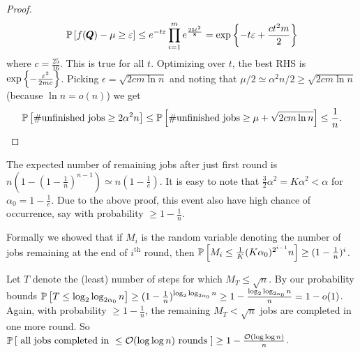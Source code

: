 \begin{proof}
\begin{align*}
\P{f(\pmb Q)-\mu\ge \epsilon} \le e^{-t\epsilon}\prod_{i=1}^{m} e^{\frac{25t^{2}}{8}} = \exp\set{-t\epsilon + \frac{ct^{2}m}{2}}
\end{align*}
where $c=\frac{25}{16}$. This is true for all $t$. Optimizing over $t$, the best RHS is $\exp\set{-\frac{\epsilon^{2}}{2mc}}$. Picking $\epsilon=\sqrt{2c m\ln n}$ and noting that $\mu/2\simeq \alpha^{2}n/2 \ge \sqrt{2cm\ln n}$ (because $\ln n=o(n)$) we get $$\P{\text{\#unfinished jobs}\ge2\alpha^{2}n} \le \P{\text{\#unfinished jobs}\ge\mu+ \sqrt{2c m\ln n}} \le \frac{1}{n}.$$
\end{proof}

The expected number of remaining jobs after just first round is $n\left(1-\left(1-\frac1n\right)^{n-1}\right) \simeq n\left(1-\frac1e\right).$ It is easy to note that $\frac32\alpha^{2}=K\alpha^{2}<\alpha$ for $\alpha_{0}=1-\frac1e$. Due to the above proof, this event also have high chance of occurrence, say with probability $\ge1-\frac{1}{n}$.

Formally we showed that if $M_{i}$ is the random variable denoting the number of jobs remaining at the end of $i^{\text{th}}$ round, then $\P{M_{i} \le \frac{1}{K}(K\alpha_{0})^{2^{i-1}}n}\ge(1-\frac1n)^{i}$.

Let $T$ denote the (least) number of steps for which $M_{T}\le \sqrt n$. By our probability bounds $\P{T \le \log_{2}\log_{2\alpha_{0}} n} \ge (1-\frac1n)^{\log_{2}\log_{2\alpha_{0}} n} \ge 1-\frac{\log_{2}\log_{2\alpha_{0}} n}{n} = 1-o(1)$. Again, with probability $\ge1-\frac1n$, the remaining $M_{T}<\sqrt n$ jobs are completed in one more round. So $\P{\text{ all jobs completed in } \le \cO(\log\log n) \text{ rounds }}\ge 1-\frac{\cO(\log\log n)}{n}$.




